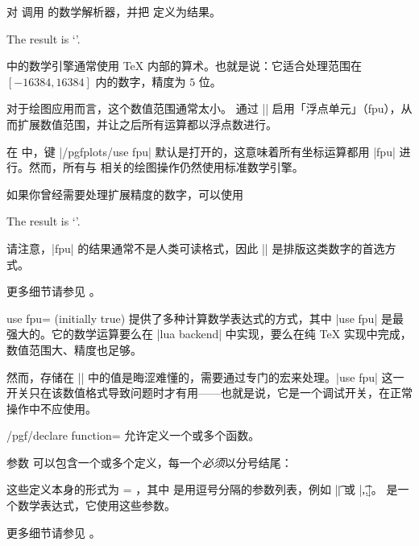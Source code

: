 \begin{command}{\pgfmathparse{}}
    对  调用 \pgfname{} 的数学解析器，并把
    \declareandlabel{\pgfmathresult} 定义为结果。
\begin{codeexample}[]

The result is `\pgfmathresult'.
\end{codeexample}
    \noindent \pgfname{} 中的数学引擎通常使用 \TeX{} 内部的算术。也就是说：它适合处理范围在
    $[-16384,16384]$ 内的数字，精度为 $5$ 位。

    对于绘图应用而言，这个数值范围通常太小。\PGFPlots{} 通过
    || 启用「浮点单元」（fpu），从而扩展数值范围，并让之后所有运算都以浮点数进行。

    在 \PGFPlots{} 中，键 |/pgfplots/use fpu| 默认是打开的，这意味着所有坐标运算都用 |fpu| 进行。然而，所有与 \pgfname{} 相关的绘图操作仍然使用标准数学引擎。

    如果你曾经需要处理扩展精度的数字，可以使用
\begin{codeexample}[]
%

The result is `\pgfmathprintnumber{\pgfmathresult}'.
\end{codeexample}
    请注意，|fpu| 的结果通常不是人类可读格式，因此 |\pgfmathprintnumber| 是排版这类数字的首选方式。

    更多细节请参见 \cite{tikz}。
\end{command}

\begin{pgfplotskey}{use fpu= (initially true)}
    \PGFPlots{} 提供了多种计算数学表达式的方式，其中 |use fpu| 是最强大的。它的数学运算要么在 |lua backend| 中实现，要么在纯 \TeX{} 实现中完成，数值范围大、精度也足够。

    然而，存储在 |\pgfmathresult| 中的值是晦涩难懂的，需要通过专门的宏来处理。|use fpu| 这一开关只在该数值格式导致问题时才有用——也就是说，它是一个调试开关，在正常操作中不应使用。
\end{pgfplotskey}

\begin{key}{/pgf/declare function=}
    允许定义一个或多个函数。

    参数  可以包含一个或多个定义，每一个\emph{必须}以分号结尾：
\begin{codeexample}[]
\end{codeexample}
    这些定义本身的形式为  =
    ，其中  是用逗号分隔的参数列表，例如 |\t| 或 |\t,\a,\b|。 是一个数学表达式，它使用这些参数。

    更多细节请参见 \cite{tikz}。
\end{key}


